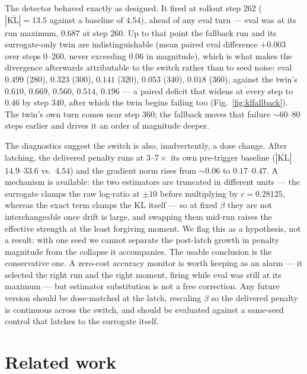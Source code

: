 \documentclass[11pt]{amsart}
\newcommand{\KL}{\mathrm{KL}}
\begin{document}
The detector behaved exactly as designed. It fired at rollout step 262
($|\overline{\KL}| = 13.5$ against a baseline of $4.54$), ahead of any eval
turn --- eval was at its run maximum, $0.687$ at step 260. Up to that point
the fallback run and its surrogate-only twin are indistinguishable (mean
paired eval difference $+0.003$ over steps 0--260, never exceeding $0.06$ in
magnitude), which is what makes the divergence afterwards attributable to the
switch rather than to seed noise: eval $0.499$ (280), $0.323$ (300), $0.141$
(320), $0.053$ (340), $0.018$ (360), against the twin's $0.610$, $0.669$,
$0.560$, $0.514$, $0.196$ --- a paired deficit that widens at every step to
$0.46$ by step 340, after which the twin begins failing too
(Fig.~\ref{fig:klfallback}). The twin's own turn comes near step 360; the
fallback moves that failure ${\sim}60$--$80$ steps earlier and drives it an
order of magnitude deeper.

The diagnostics suggest the switch is also, inadvertently, a dose change.
After latching, the delivered penalty runs at $3$--$7\times$ its own
pre-trigger baseline ($|\overline{\KL}|$ $14.9$--$33.6$ vs.\ $4.54$) and the
gradient norm rises from ${\sim}0.06$ to $0.17$--$0.47$. A mechanism is
available: the two estimators are truncated in different units --- the
surrogate clamps the raw log-ratio at $\pm10$ before multiplying by
$c = 0.28125$, whereas the exact term clamps the KL itself --- so at fixed
$\beta$ they are not interchangeable once drift is large, and swapping them
mid-run raises the effective strength at the least forgiving moment. We flag
this as a hypothesis, not a result: with one seed we cannot separate the
post-latch growth in penalty magnitude from the collapse it accompanies. The
usable conclusion is the conservative one. A zero-cost accuracy monitor is
worth keeping as an alarm --- it selected the right run and the right moment,
firing while eval was still at its maximum --- but estimator substitution is
not a free correction. Any future
version should be dose-matched at the latch, rescaling $\beta$ so the
delivered penalty is continuous across the switch, and should be evaluated
against a same-seed control that latches to the surrogate itself.

\section{Related work}
\end{document}
